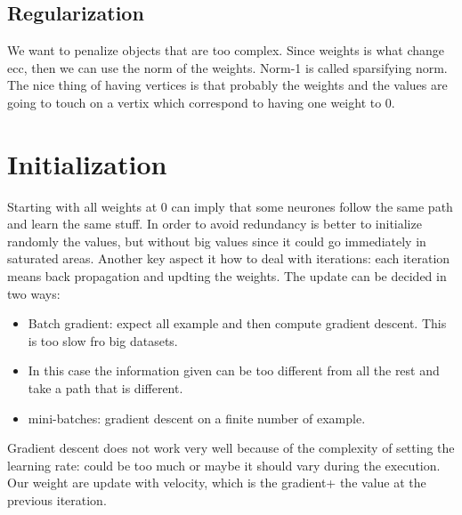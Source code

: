 \subsection{Regularization}
We want to penalize objects that are too complex. Since weights is what change ecc, then we can use the norm of the weights. 
Norm-1 is called sparsifying norm. The nice thing of having vertices is that probably the weights and the values are going to touch on a vertix which correspond to having one weight to 0.
\section{Initialization}
Starting with all weights at 0 can imply that some neurones follow the same path and learn the same stuff. In order to avoid redundancy is better to initialize randomly the values, but without big values since it could go immediately in saturated areas.\newline
Another key aspect it how to deal with iterations: each iteration means back propagation and updting the weights. The update can be decided in two ways:
\begin{itemize}
	\item Batch gradient: expect all example and then compute gradient descent. This is too slow fro big datasets.
	\item In this case the information given can be too different from all the rest and take a path that is different.
	\item mini-batches: gradient descent on a finite number of example. 
\end{itemize}
Gradient descent does not work very well because of the complexity of setting the learning rate: could be too much or maybe it should vary during the execution. \newline
Our weight are update with velocity, which is the gradient+ the value at the previous iteration. 

